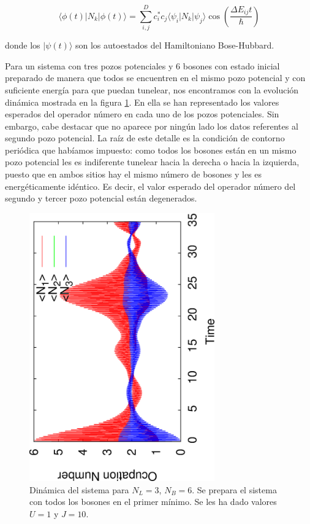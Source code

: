 \documentclass[11pt,a4paper]{article}
\begin{document}
\begin{equation}
  \langle\phi(t)|N_k|\phi(t)\rangle=\sum_{i,j}^{D}c_i^*c_j\langle\psi_i|N_k|\psi_j\rangle \cos(\frac{\Delta E_{ij}t}{\hbar})
\end{equation}

donde los $|\psi(t)\rangle$ son los autoestados del Hamiltoniano Bose-Hubbard.

Para un sistema con tres pozos potenciales y 6 bosones con estado inicial preparado de manera que todos se encuentren en el mismo pozo potencial y con suficiente energía para que puedan tunelear, nos encontramos con la evolución dinámica mostrada en la figura \ref{f:dinamica}. En ella se han representado los valores esperados del operador número en cada uno de los pozos potenciales. Sin embargo, cabe destacar que no aparece por ningún lado los datos referentes al segundo pozo potencial. La raíz de este detalle es la condición de contorno periódica que habíamos impuesto: como todos los bosones están en un mismo pozo potencial les es indiferente tunelear hacia la derecha o hacia la izquierda, puesto que en ambos sitios hay el mismo número de bosones y les es energéticamente idéntico. Es decir, el valor esperado del operador número del segundo y tercer pozo potencial están degenerados.


\begin{figure}[h]
  \centering
  \includegraphics[width=8cm,angle=270]{Prop_600_NL3_NB6_U1_J10.eps}
  \caption{Dinámica del sistema para $N_L=3$, $N_B=6$. Se prepara el sistema con todos los bosones en el primer mínimo. Se les ha dado valores $U=1$ y $J=10$.}
  \label{f:dinamica}
\end{figure}
\noindent
\end{document}
